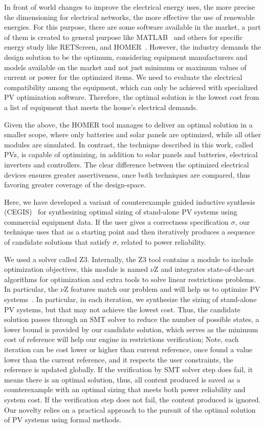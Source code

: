 \documentclass[10pt,journal,compsoc]{IEEEtran}
\begin{document}
In front of world changes to improve the electrical energy uses, the more precise the dimensioning for electrical networks, the more effective the use of renewable energies. For this purpose, there are some software available in the market, a part of them is created to general purpose like MATLAB~\cite{Benatiallah2017} and others for specific energy study like RETScreen, and HOMER~\cite{Pradhan,Swarnkar}. However, the
industry demands the design solution to be the optimum, considering equipment manufacturers and models available on the market and not just minimum or maximum
values of current or power for the optimized items. We need to evaluate the electrical compatibility among the equipment, which can only be achieved with specialized PV optimization software. Therefore, the optimal solution is the lowest cost from a list of equipment that meets the house’s electrical demands.

Given the above, the HOMER tool manages to deliver an optimal solution in a smaller scope, where only batteries and solar panels are optimized, while all other modules are simulated. In contrast, the technique described in this work, called PVz, is capable of optimizing, in addition to solar panels and batteries, electrical inverters and controllers. The clear difference between the optimized electrical devices ensures greater assertiveness, once both techniques are compared, thus favoring greater coverage of the design-space.
\color{black}

Here, we have developed a variant of counterexample guided inductive synthesis (CEGIS)~\cite{AbateCAV2018} for synthesizing optimal sizing of stand-alone PV systems using commercial equipment data. If the user gives a correctness specification $\sigma$, our technique uses that as a starting point and then iteratively produces a sequence of candidate solutions that satisfy $\sigma$, related to power reliability.


\color{blue} 
We used a solver called Z3. Internally, the Z3 tool contains a module to include optimization objectives, this module is named $\nu$Z and integrates state-of-the-art algorithms for optimization and extra tools to solve linear restrictions problems. In particular, the $\nu$Z features match our problem and will help us to optimize PV systems~\cite{BjornerPF15}.
In particular, in each iteration, we synthesize the sizing of stand-alone PV systems, but that may not achieve the lowest cost. Thus, the candidate solution passes through an SMT solver to reduce the number of possible states, a lower bound is provided by our candidate solution, which serves as the minimum cost of reference will help our engine in restrictions verification; Note, each iteration can be cost lower or higher than current reference, once found a value lower than the current reference, and it respects the user constraints, the reference is updated globally. 
If the verification by SMT solver step does fail, it means there is an optimal solution, thus, all content produced is saved as a counterexample with an optimal sizing that meets both power reliability and system cost. If the verification step does not fail, the content produced is ignored. Our novelty relies on a practical approach to the pursuit of the optimal solution of PV systems using formal methods. 
\end{document}
